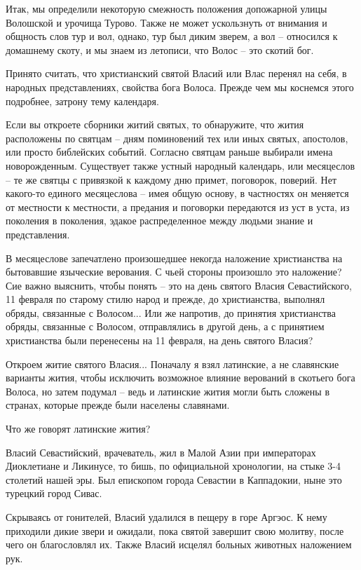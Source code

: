    Итак, мы определили некоторую смежность положения допожарной улицы Волошской и урочища Турово. Также не может ускользнуть от внимания и общность слов тур и вол, однако, тур был диким зверем, а вол – относился к домашнему скоту, и мы знаем из летописи, что Волос – это скотий бог.

   Принято считать, что христианский святой Власий или Влас перенял на себя, в народных представлениях, свойства бога Волоса. Прежде чем мы коснемся этого подробнее, затрону тему календаря.

   Если вы откроете сборники житий святых, то обнаружите, что жития расположены по святцам – дням поминовений тех или иных святых, апостолов, или просто библейских событий. Согласно святцам раньше выбирали имена новорожденным. Существует также устный народный календарь, или месяцеслов – те же святцы с привязкой к каждому дню примет, поговорок, поверий. Нет какого-то единого месяцеслова – имея общую основу, в частностях он меняется от местности к местности, а предания и поговорки передаются из уст в уста, из поколения в поколения, эдакое распределенное между людьми знание и представления.

В месяцеслове запечатлено произошедшее некогда наложение христианства на бытовавшие языческие верования. С чьей стороны произошло это наложение? Сие важно выяснить, чтобы понять – это на день святого Власия Севастийского, 11 февраля по старому стилю народ и прежде, до христианства, выполнял обряды, связанные с Волосом... Или же напротив, до принятия христианства обряды, связанные с Волосом, отправлялись в другой день, а с принятием христианства были перенесены на 11 февраля, на день святого Власия?

    Откроем житие святого Власия... Поначалу я взял латинские, а не славянские варианты жития, чтобы исключить возможное влияние верований в скотьего бога Волоса, но затем подумал – ведь и латинские жития могли быть сложены в странах, которые прежде были населены славянами. 

   Что же говорят латинские жития?

   Власий Севастийский, врачеватель, жил в Малой Азии при императорах Диоклетиане и Ликинусе, то бишь, по официальной хронологии, на стыке 3-4 столетий нашей эры. Был епископом города Севастии в Каппадокии, ныне это турецкий город Сивас.

   Скрываясь от гонителей, Власий удалился в пещеру в горе Аргэос. К нему приходили дикие звери и ожидали, пока святой завершит свою молитву, после чего он благословлял их. Также Власий исцелял больных животных наложением рук.

